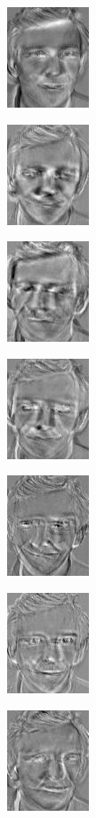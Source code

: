 \documentclass[a4paper]{article}
\begin{document}
\includegraphics[scale=0.500000]{PrincipalComponent2.jpg}

\includegraphics[scale=0.500000]{PrincipalComponent3.jpg}

\includegraphics[scale=0.500000]{PrincipalComponent4.jpg}

\includegraphics[scale=0.500000]{PrincipalComponent5.jpg}

\includegraphics[scale=0.500000]{PrincipalComponent6.jpg}

\includegraphics[scale=0.500000]{PrincipalComponent7.jpg}

\includegraphics[scale=0.500000]{PrincipalComponent8.jpg}
\end{document}

